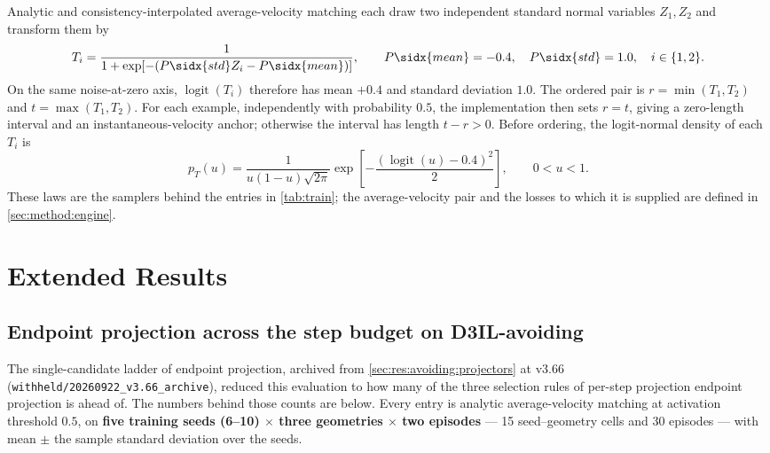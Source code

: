 Analytic and consistency-interpolated average-velocity matching each draw two independent standard
normal variables $Z_1,Z_2$ and transform them by
\begin{equation}
  T_i=\frac{1}{1+\exp[-(P\sidx{std}Z_i-P\sidx{mean})]},\qquad
  P\sidx{mean}=-0.4,\quad P\sidx{std}=1.0,\quad i\in\{1,2\}.
\end{equation}
On the same noise-at-zero axis, $\operatorname{logit}(T_i)$ therefore has mean $+0.4$ and standard
deviation $1.0$. The ordered pair is $r=\min(T_1,T_2)$ and $t=\max(T_1,T_2)$. For each example,
independently with probability $0.5$, the implementation then sets $r=t$, giving a zero-length interval and an
instantaneous-velocity anchor; otherwise the interval has length $t-r>0$. Before ordering, the
logit-normal density of each $T_i$ is
\begin{equation}
  p_T(u)=\frac{1}{u(1-u)\sqrt{2\pi}}
  \exp\!\left[-\frac{(\operatorname{logit}(u)-0.4)^2}{2}\right],\qquad 0<u<1.
\end{equation}
These laws are the samplers behind the entries in \autoref{tab:train}; the average-velocity pair and
the losses to which it is supplied are defined in \autoref{sec:method:engine}.

\chapter{Extended Results}\label{app:results}

\section*{Endpoint projection across the step budget on D3IL-avoiding}

The single-candidate ladder of endpoint projection, archived from \autoref{sec:res:avoiding:projectors} at v3.66 (\texttt{withheld/20260922\_v3.66\_archive}), reduced this evaluation to how many of the three selection rules of per-step
projection endpoint projection is ahead of. The numbers behind those counts are below. Every entry is
analytic average-velocity matching at activation threshold $0.5$, on \textbf{five training seeds (6--10)
$\times$ three geometries $\times$ two episodes} --- 15 seed--geometry cells and 30 episodes --- with
mean $\pm$ the sample standard deviation over the seeds.

